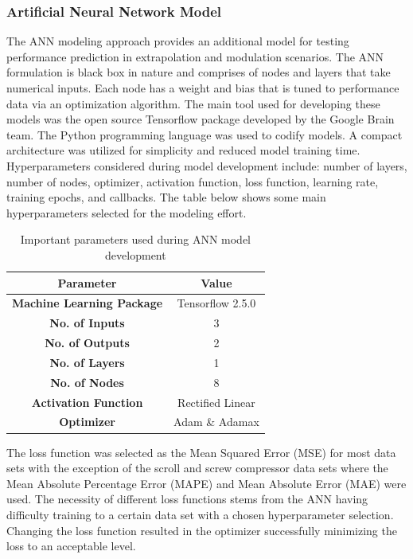 \documentclass[preprint,11pt,authoryear]{elsarticle}
\begin{document}
\subsubsection{Artificial Neural Network Model}

The ANN modeling approach provides an additional model for testing performance prediction in extrapolation and modulation scenarios. The ANN formulation is black box in nature and comprises of nodes and layers that take numerical inputs. Each node has a weight and bias that is tuned to performance data via an optimization algorithm. The main tool used for developing these models was the open source Tensorflow package developed by the Google Brain team. The Python programming language was used to codify models. A compact architecture was utilized for simplicity and reduced model training time. Hyperparameters considered during model development include: number of layers, number of nodes, optimizer, activation function, loss function, learning rate, training epochs, and callbacks. The table below shows some main hyperparameters selected for the modeling effort. 

\begin{table}[h]
\caption{Important parameters used during ANN model development}
\label{Tab:ann_overview}
\begin{center}
\begin{tabular}{c c}
\hline
\hline
\textbf{Parameter} & Value\\
\hline
\textbf{Machine Learning Package} & Tensorflow 2.5.0 \\
\textbf{No. of Inputs} & 3 \\
\textbf{No. of Outputs} & 2 \\
\textbf{No. of Layers} & 1 \\
\textbf{No. of Nodes} & 8 \\
\textbf{Activation Function} & Rectified Linear \\
\textbf{Optimizer} & Adam \& Adamax
\\
\hline
\hline
\end{tabular}
\end{center}
\end{table}

The loss function was selected as the Mean Squared Error (MSE) for most data sets with the exception of the scroll and screw compressor data sets where the Mean Absolute Percentage Error (MAPE) and Mean Absolute Error (MAE) were used. The necessity of different loss functions stems from the ANN having difficulty training to a certain data set with a chosen hyperparameter selection. Changing the loss function resulted in the optimizer successfully minimizing the loss to an acceptable level. 
\end{document}
